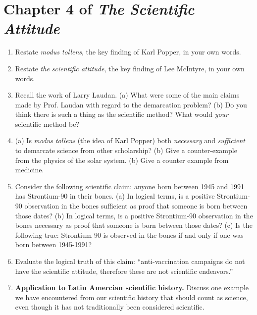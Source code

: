 \documentclass[12pt]{article}
\begin{document}
\maketitle

\small

\section{Chapter 4 of \textit{The Scientific Attitude}}

\begin{enumerate}
\item Restate \textit{modus tollens}, the key finding of Karl Popper, in your own words. \\ \vspace{0.5cm}
\item Restate \textit{the scientific attitude}, the key finding of Lee McIntyre, in your own words. \\ \vspace{0.5cm}
\item Recall the work of Larry Laudan.  (a) What were some of the main claims made by Prof. Laudan with regard to the demarcation problem? (b) Do you think there is such a thing as the scientific method?  What would \textit{your} scientific method be? \\ \vspace{0.5cm}
\item (a) Is \textit{modus tollens} (the idea of Karl Popper) both \textit{necessary} and \textit{sufficient} to demarcate science from other scholarship? (b) Give a counter-example from the physics of the solar system. (b) Give a counter example from medicine. \\ \vspace{0.5cm}
\item Consider the following scientific claim: anyone born between 1945 and 1991 has Strontium-90 in their bones.  (a) In logical terms, is a positive Strontium-90 observation in the bones sufficient as proof that someone is born between those dates? (b) In logical terms, is a positive Strontium-90 observation in the bones necessary as proof that someone is born between those dates? (c) Is the following true: Strontium-90 is observed in the bones if and only if one was born between 1945-1991? \\ \vspace{1cm}
\item Evaluate the logical truth of this claim: ``anti-vaccination campaigns do not have the scientific attitude, therefore these are not scientific endeavors.'' \\ \vspace{1cm}
\item \textbf{Application to Latin Amercian scientific history.} Discuss one example we have encountered from our scientific history that should count as science, even though it has not traditionally been considered scientific.
\end{enumerate}
\end{document}
